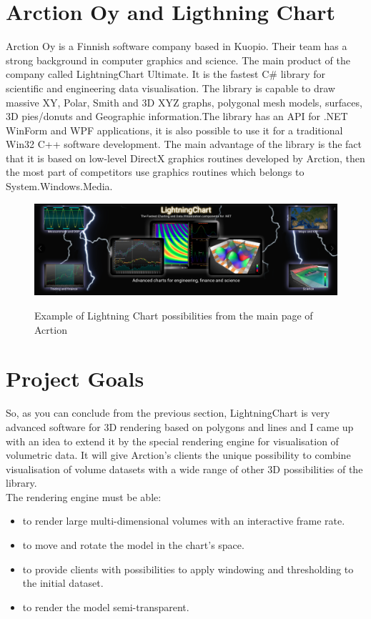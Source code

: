 \documentclass[english, 11pt]{report}
\begin{document}

\section{Arction Oy and Ligthning Chart}

Arction Oy is a Finnish software company based in Kuopio. Their team has a strong background in computer graphics and science. The main product of the company called LightningChart Ultimate. It is the fastest C\# library for scientific and engineering data visualisation. The library is capable to draw massive XY, Polar, Smith and 3D XYZ graphs, polygonal mesh models, surfaces, 3D pies/donuts and Geographic information.The library has an API for .NET WinForm and WPF applications, it is also possible to use it for a traditional Win32 C++ software development. The main advantage of the library is the fact that it is based on low-level DirectX graphics routines developed by Arction, then the most part of competitors use graphics routines which belongs to System.Windows.Media.\\
\begin{figure}[H]
\includegraphics[scale=0.33]{img/lchu}\\
\caption{Example of Lightning Chart possibilities from the main page of Acrtion}
\end{figure}

\section{Project Goals}

So, as you can conclude from the previous section, LightningChart is very advanced software for 3D rendering based on polygons and lines and I came up with an idea to extend it by the special rendering engine for visualisation of volumetric data. It will give Arction's clients the unique possibility to combine visualisation of volume datasets with a wide range of other 3D possibilities of the library. \\

The rendering engine must be able:
\begin{itemize} 
\item to render large multi-dimensional volumes with an interactive frame rate.
\item to move and rotate the model in the chart's space.
\item to provide clients with possibilities to apply windowing and thresholding to the initial dataset.
\item to render the model semi-transparent.
\end{itemize}
\end{document}
